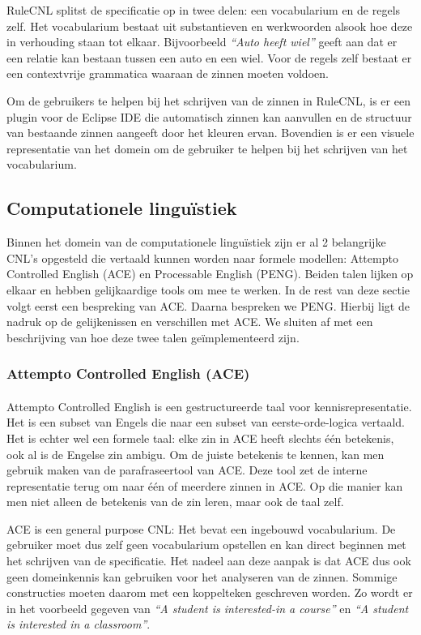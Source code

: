 \documentclass[]{article}
\theoremstyle{definition}
\newcommand{\example}[1]{\textit{``#1''}}
\begin{document}
RuleCNL splitst de specificatie op in twee delen: een vocabularium en de regels zelf. Het vocabularium bestaat uit substantieven en werkwoorden alsook hoe deze in verhouding staan tot elkaar. Bijvoorbeeld \example{Auto heeft wiel} geeft aan dat er een relatie kan bestaan tussen een auto en een wiel. Voor de regels zelf bestaat er een contextvrije grammatica waaraan de zinnen moeten voldoen.

Om de gebruikers te helpen bij het schrijven van de zinnen in RuleCNL, is er een plugin voor de Eclipse IDE die automatisch zinnen kan aanvullen en de structuur van bestaande zinnen aangeeft door het kleuren ervan. Bovendien is er een visuele representatie van het domein om de gebruiker te helpen bij het schrijven van het vocabularium.

\subsection{Computationele linguïstiek} Binnen het domein van de computationele linguïstiek zijn er al 2 belangrijke CNL's opgesteld die vertaald kunnen worden naar formele modellen: Attempto Controlled English (ACE) en Processable English (PENG). Beiden talen lijken op elkaar en hebben gelijkaardige tools om mee te werken. In de rest van deze sectie volgt eerst een bespreking van ACE. Daarna bespreken we PENG. Hierbij ligt de nadruk op de gelijkenissen en verschillen met ACE. We sluiten af met een beschrijving van hoe deze twee talen geïmplementeerd zijn.

\subsubsection{Attempto Controlled English (ACE)}
\paragraph{} Attempto Controlled English\cite{Fuchs2008} is een gestructureerde taal voor kennisrepresentatie. Het is een subset van Engels die naar een subset van eerste-orde-logica vertaald. Het is echter wel een formele taal: elke zin in ACE heeft slechts één betekenis, ook al is de Engelse zin ambigu. Om de juiste betekenis te kennen, kan men gebruik maken van de parafraseertool van ACE. Deze tool zet de interne representatie terug om naar één of meerdere zinnen in ACE. Op die manier kan men niet alleen de betekenis van de zin leren, maar ook de taal zelf.

ACE is een general purpose CNL: Het bevat een ingebouwd vocabularium. De gebruiker moet dus zelf geen vocabularium opstellen en kan direct beginnen met het schrijven van de specificatie. Het nadeel aan deze aanpak is dat ACE dus ook geen domeinkennis kan gebruiken voor het analyseren van de zinnen. Sommige constructies moeten daarom met een koppelteken geschreven worden. Zo wordt er in \cite{ACEConstructionRules} het voorbeeld gegeven van \example{A student is interested-in a course} en \example{A student is interested in a classroom}.
\end{document}
